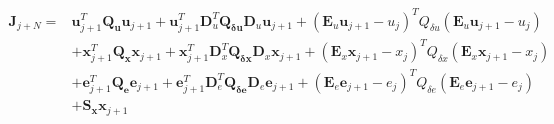 \documentclass[landscape]{article}
\begin{document}
\begin{equation}
\begin{split}
\mathbf{J}_{j+N} = 
& \mathbf{u}_{j+1}^T \mathbf{Q_u} \mathbf{u}_{j+1} + \mathbf{u}_{j+1}^T \mathbf{D}_u^T \mathbf{Q_{\delta u}} \mathbf{D}_u \mathbf{u}_{j+1} 
+ \left(\mathbf{E}_u\mathbf{u}_{j+1}-u_j\right)^T Q_{\delta u} \left(\mathbf{E}_u\mathbf{u}_{j+1}-u_j\right)\\
&+\mathbf{x}_{j+1}^T \mathbf{Q_x} \mathbf{x}_{j+1} + \mathbf{x}_{j+1}^T \mathbf{D}_x^T \mathbf{Q_{\delta x}} \mathbf{D}_x \mathbf{x}_{j+1} 
+ \left(\mathbf{E}_x\mathbf{x}_{j+1}-x_j\right)^T Q_{\delta x} \left(\mathbf{E}_x\mathbf{x}_{j+1}-x_j\right)\\
&+\mathbf{e}_{j+1}^T \mathbf{Q_e} \mathbf{e}_{j+1} + \mathbf{e}_{j+1}^T \mathbf{D}_e^T \mathbf{Q_{\delta e}} \mathbf{D}_e \mathbf{e}_{j+1} 
+ \left(\mathbf{E}_e\mathbf{e}_{j+1}-e_j\right)^T Q_{\delta e} \left(\mathbf{E}_e\mathbf{e}_{j+1}-e_j\right)\\
&+\mathbf{S_x}\mathbf{x}_{j+1}
\end{split}
\end{equation}
\end{document}
